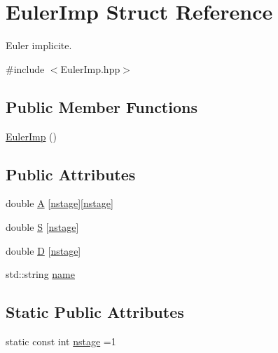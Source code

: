 \hypertarget{structEulerImp}{\section{Euler\-Imp Struct Reference}
\label{structEulerImp}
}


Euler implicite.  




{\ttfamily \#include $<$Euler\-Imp.\-hpp$>$}

\subsection*{Public Member Functions}
\begin{DoxyCompactItemize}
\item 
\hyperlink{structEulerImp_aca04bd3f105ce3fc5b77267e634604ae}{Euler\-Imp} ()
\end{DoxyCompactItemize}
\subsection*{Public Attributes}
\begin{DoxyCompactItemize}
\item 
double \hyperlink{structEulerImp_a9696fe25e092ba525ca929e16f5244e6}{A} \mbox{[}\hyperlink{structEulerImp_a10a0277bebf35dd22df6827f4e1311bb}{nstage}\mbox{]}\mbox{[}\hyperlink{structEulerImp_a10a0277bebf35dd22df6827f4e1311bb}{nstage}\mbox{]}
\item 
double \hyperlink{structEulerImp_acad84c415cd443ec0190344ca5947a0c}{S} \mbox{[}\hyperlink{structEulerImp_a10a0277bebf35dd22df6827f4e1311bb}{nstage}\mbox{]}
\item 
double \hyperlink{structEulerImp_aae89cc5b49a2315dd0ed0f5deb20a621}{D} \mbox{[}\hyperlink{structEulerImp_a10a0277bebf35dd22df6827f4e1311bb}{nstage}\mbox{]}
\item 
std\-::string \hyperlink{structEulerImp_ac40dc2dcd3e175c730f562d2e4a1c88d}{name}
\end{DoxyCompactItemize}
\subsection*{Static Public Attributes}
\begin{DoxyCompactItemize}
\item 
static const int \hyperlink{structEulerImp_a10a0277bebf35dd22df6827f4e1311bb}{nstage} =1
\end{DoxyCompactItemize}


